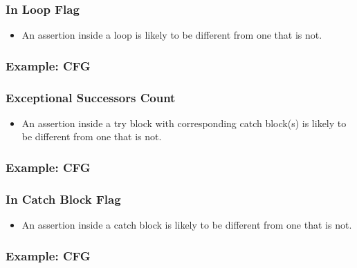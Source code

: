 \documentclass{beamer}
\begin{document}
\begin{frame}
   \frametitle{In Loop Flag} {\Large	
     \begin{itemize}
        \item An assertion inside a loop is likely to be different from one that is not.
     \end{itemize}
	}
\end{frame}

\begin{frame}
  \frametitle{Example: CFG} {\Large	
     \vspace*{-1em}
     
	}
\end{frame}

\begin{frame}
   \frametitle{Exceptional Successors Count} {\Large	
     \begin{itemize}
        \item An assertion inside a try block with corresponding catch block(s) is likely to be different from one that is not.
     \end{itemize}
	}
\end{frame}

\begin{frame}
  \frametitle{Example: CFG} {\Large	
     \vspace*{-1em}
     
	}
\end{frame}

\begin{frame}
   \frametitle{In Catch Block Flag} {\Large	
     \begin{itemize}
        \item An assertion inside a catch block is likely to be different from one that is not.
     \end{itemize}
	}
\end{frame}

\begin{frame}
  \frametitle{Example: CFG} {\Large	
     \vspace*{-1em}
     
	}
\end{frame}
\end{document}
